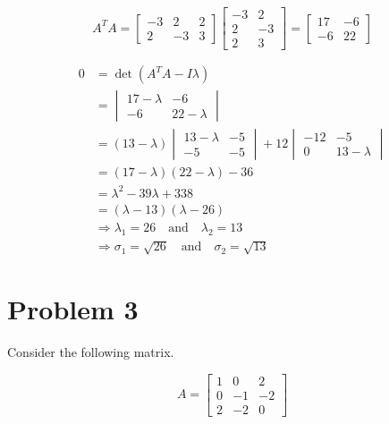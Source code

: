\documentclass[letter,11pt]{article}
\theoremstyle{definition}
\begin{document}
\begin{tcolorbox}[boxrule=1mm, width=(\linewidth),before=\hfill,after=\hfill,adjusted title={Problem 2 Solutions}]
    $$A^{T}A = \begin{bmatrix}-3 & 2 & 2 \\ 2 & -3 &3\end{bmatrix}\begin{bmatrix}-3 & 2 \\ 2 & -3 \\ 2 & 3\end{bmatrix} = \begin{bmatrix}17 & -6 \\ -6 & 22 \end{bmatrix}$$

    \begin{align*}
        0 &= \operatorname{det} \left(A^{T}A - I\lambda\right)\\
        &= \begin{vmatrix}17-\lambda & -6 \\ -6 & 22- \lambda\end{vmatrix}\\
        &= (13-\lambda)\begin{vmatrix}13 - \lambda & -5\\ -5 & -5\end{vmatrix} + 12\begin{vmatrix} -12 & -5\\ 0 & 13-\lambda\end{vmatrix}\\
        & = (17-\lambda)(22-\lambda)-36\\
        & = \lambda^2 -39\lambda+338\\
        & = (\lambda-13)(\lambda - 26)\\
        & \Rightarrow \lambda_{1}= 26\quad \text{and} \quad \lambda_{2} = 13\\
        & \boxed{\Rightarrow \sigma_{1} = \sqrt{26} \quad \text{and} \quad \sigma_{2} = \sqrt{13}}
    \end{align*}
\end{tcolorbox}
\newpage

\section{Problem 3}
Consider the following matrix.

$$
A=\begin{bmatrix}
1 & 0 & 2 \\ 0 & -1 & -2 \\ 2 & -2 & 0
\end{bmatrix}
$$
\end{document}

